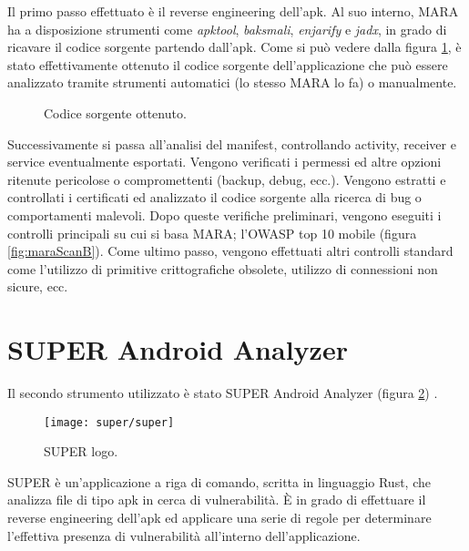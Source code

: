 Il primo passo effettuato è il reverse engineering dell'apk. Al suo interno, MARA ha a disposizione strumenti come \emph{apktool}, \emph{baksmali}, \emph{enjarify} e \emph{jadx}, in grado di ricavare il codice sorgente partendo dall'apk. Come si può vedere dalla figura \ref{fig:source}, è stato effettivamente ottenuto il codice sorgente dell'applicazione che può essere analizzato tramite strumenti automatici (lo stesso MARA lo fa) o manualmente.

\begin{figure}[h]
	\centering 
	\caption{Codice sorgente ottenuto.}
	\label{fig:source} 
\end{figure}

Successivamente si passa all'analisi del manifest, controllando activity, receiver e service eventualmente esportati. Vengono verificati i permessi ed altre opzioni ritenute pericolose o compromettenti (backup, debug, ecc.). Vengono estratti e controllati i certificati ed analizzato il codice sorgente alla ricerca di bug o comportamenti malevoli. Dopo queste verifiche preliminari, vengono eseguiti i controlli principali su cui si basa MARA; l'OWASP top 10 mobile (figura \ref{fig:maraScanB}). Come ultimo passo, vengono effettuati altri controlli standard come l'utilizzo di primitive crittografiche obsolete, utilizzo di connessioni non sicure, ecc.


\section{SUPER Android Analyzer}

Il secondo strumento utilizzato è stato \ac{SUPER} Android Analyzer (figura \ref{fig:super}) \cite{SUPER}. 

\begin{figure}[h]
	\centering 
	\texttt{[image: super/super]} 
	\caption{SUPER logo.}
	\label{fig:super} 
\end{figure}

SUPER è un'applicazione a riga di comando, scritta in linguaggio Rust, che analizza file di tipo apk in cerca di vulnerabilità. È in grado di effettuare il reverse engineering dell'apk ed applicare una serie di regole per determinare l'effettiva presenza di vulnerabilità all'interno dell'applicazione. 

